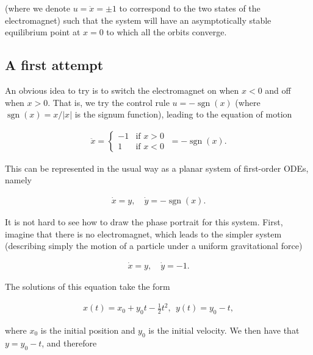 \documentclass[11pt]{report}
\theoremstyle{plain}
\theoremstyle{definition}
\begin{document}
\noindent (where we denote $u=\ddot{x}=\pm 1$ to correspond to
the two states of the electromagnet) such that the
system will have an asymptotically stable equilibrium
point at $x=0$ to which all the orbits converge.

\subsection{A first attempt}

An obvious idea to try is to switch the electromagnet
on when $x<0$ and off when $x>0$. That is, we try the
control rule $u=-\operatorname{sgn}(x)$ (where
$\operatorname{sgn}(x)=x/|x|$ is the signum function),
leading to the equation of motion

\begin{equation*} \tag{43}\label{eq:magnet-unstable}
\begin{split}
\ddot{x} = \begin{cases} -1 & \textrm{if }x>0 \\ 1&\textrm{if }x<0\end{cases} \ = -\operatorname{sgn}(x).
\end{split}
\end{equation*}

\noindent This can be represented in the usual way as a planar
system of first-order ODEs, namely

\begin{align*}
\dot{x} = y, \quad \dot{y}= - \operatorname{sgn}(x).
\end{align*}

\noindent It is not hard to see how to draw the phase portrait
for this system. First, imagine that there is no
electromagnet, which leads to the simpler system
(describing simply the motion of a particle under a
uniform gravitational force)

\begin{equation*} \tag{44}\label{eq:gravity-system}
\begin{split}
\dot{x} = y, \quad \dot{y}= -1.
\end{split}
\end{equation*}

\noindent The solutions of this equation take the form

\begin{align*}
x(t) = x_0 + y_0t -\tfrac12 t^2, \ \ y(t)=y_0-t,
\end{align*}

\noindent where $x_0$ is the initial position and $y_0$ is the
initial velocity. We then have that $y=y_0-t$, and
therefore
\end{document}
